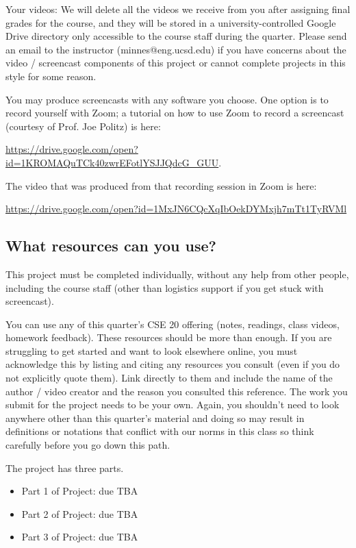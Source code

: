 \documentclass[12pt, oneside]{article}
\begin{document}
Your videos: We will delete all the videos we receive from you after assigning final grades for the course, 
and they will be stored in a university-controlled Google Drive directory 
only accessible to the course staff during the quarter. 
Please send an email to the instructor (minnes@eng.ucsd.edu) if you have 
concerns about 
the video / screencast components of this project or cannot complete projects in this style for some reason.

You may produce screencasts with any software you choose. 
One option is to record yourself with Zoom; a tutorial on how to use Zoom to record a 
screencast (courtesy of Prof. Joe Politz)  is here: 

\url{https://drive.google.com/open?id=1KROMAQuTCk40zwrEFotlYSJJQdcG_GUU}.

The video that was produced from that recording session in Zoom is here:

\url{https://drive.google.com/open?id=1MxJN6CQcXqIbOekDYMxjh7mTt1TyRVMl}

\subsection*{What resources can you use?}
This project must be completed individually, without any help from other people, 
including the course staff (other than logistics support if you get stuck with screencast). 

You can use any of this quarter's CSE 20 offering (notes, readings, class videos, homework feedback). 
These resources should be more than enough. If you are struggling to get started and want to 
look elsewhere online, you must acknowledge this by listing and citing any resources you consult 
(even if you do not explicitly quote them). Link directly to them and include the name of the 
author / video creator and the reason you consulted this reference. The work you submit for 
the project needs to be your own. Again, you shouldn't need to look anywhere other 
than this quarter's material and doing so may result in definitions or notations 
that conflict with our norms in this class so think carefully before you go down this path.

The project has three parts. 
\begin{itemize}
    \item Part 1 of Project: due TBA
    \item Part 2 of Project: due TBA
    \item Part 3 of Project: due TBA
\end{itemize}
\end{document}
